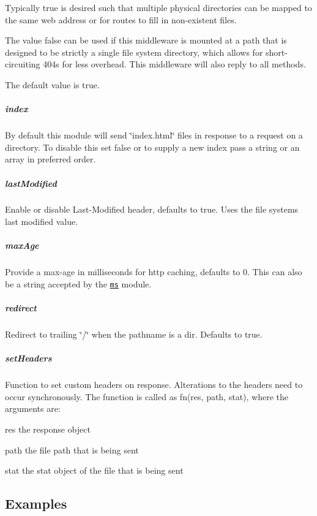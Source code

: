 Typically {\ttfamily true} is desired such that multiple physical directories can be mapped to the same web address or for routes to fill in non-\/existent files.

The value {\ttfamily false} can be used if this middleware is mounted at a path that is designed to be strictly a single file system directory, which allows for short-\/circuiting 404s for less overhead. This middleware will also reply to all methods.

The default value is {\ttfamily true}.

\subparagraph*{index}

By default this module will send \char`\"{}index.\+html\char`\"{} files in response to a request on a directory. To disable this set {\ttfamily false} or to supply a new index pass a string or an array in preferred order.

\subparagraph*{last\+Modified}

Enable or disable {\ttfamily Last-\/\+Modified} header, defaults to true. Uses the file system\textquotesingle{}s last modified value.

\subparagraph*{max\+Age}

Provide a max-\/age in milliseconds for http caching, defaults to 0. This can also be a string accepted by the \href{https://www.npmjs.org/package/ms#readme}{\tt ms} module.

\subparagraph*{redirect}

Redirect to trailing \char`\"{}/\char`\"{} when the pathname is a dir. Defaults to {\ttfamily true}.

\subparagraph*{set\+Headers}

Function to set custom headers on response. Alterations to the headers need to occur synchronously. The function is called as {\ttfamily fn(res, path, stat)}, where the arguments are\+:


\begin{DoxyItemize}
\item {\ttfamily res} the response object
\item {\ttfamily path} the file path that is being sent
\item {\ttfamily stat} the stat object of the file that is being sent
\end{DoxyItemize}

\subsection*{Examples}

